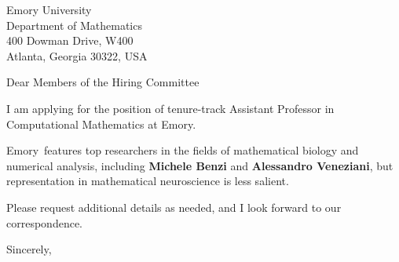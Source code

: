 




	
	
	\def\School{Emory}
	
	\begin{letter}
		{Emory University\\
			Department of Mathematics\\
			400 Dowman Drive, W400\\
			Atlanta, Georgia 30322, USA
		}
		
		\opening{Dear Members of the Hiring Committee}
		
		
		I am applying for the position of tenure-track Assistant Professor in Computational Mathematics at \School. 
		
		
		
		\School~features top researchers in the fields of mathematical biology and numerical analysis, including \textbf{Michele Benzi} and \textbf{Alessandro Veneziani}, but representation in mathematical neuroscience is less salient. 
		
		
		
		
		
		Please request additional details as needed, and I look forward to our correspondence.
		
		\closing{Sincerely,}
	\end{letter}
